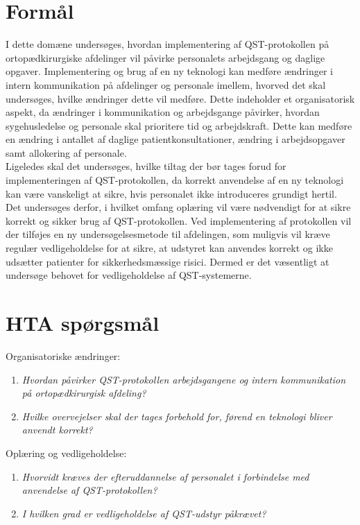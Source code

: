 \section{Formål}
I dette domæne undersøges, hvordan implementering af QST-protokollen på ortopædkirurgiske afdelinger vil påvirke personalets arbejdsgang og daglige opgaver. Implementering og brug af en ny teknologi kan medføre ændringer i intern kommunikation  på afdelinger og personale imellem, hvorved det skal undersøges, hvilke ændringer dette vil medføre. Dette indeholder et organisatorisk aspekt, da ændringer i kommunikation og arbejdsgange påvirker, hvordan sygehusledelse og personale skal prioritere tid og arbejdskraft. Dette kan medføre en ændring i antallet af daglige patientkonsultationer, ændring i arbejdsopgaver samt allokering af personale. \\
Ligeledes skal det undersøges, hvilke tiltag der bør tages forud for implementeringen af QST-protokollen, da korrekt anvendelse af en ny teknologi kan være vanskeligt at sikre, hvis personalet ikke introduceres grundigt hertil. Det undersøges derfor, i hvilket omfang oplæring vil være nødvendigt for at sikre korrekt og sikker brug af QST-protokollen. Ved implementering af protokollen vil der tilføjes en ny undersøgelsesmetode til afdelingen, som muligvis vil kræve regulær vedligeholdelse for at sikre, at udstyret kan anvendes korrekt og ikke udsætter patienter for sikkerhedsmæssige risici. Dermed er det væsentligt at undersøge behovet for vedligeholdelse af QST-systemerne.

\section{HTA spørgsmål}
Organisatoriske ændringer:
\begin{enumerate}
	\item \textit{Hvordan påvirker QST-protokollen arbejdsgangene og intern kommunikation på ortopædkirurgisk afdeling?} %
	\item \textit{Hvilke overvejelser skal der tages forbehold for, førend en teknologi bliver anvendt korrekt?} %
\end{enumerate}
Oplæring og vedligeholdelse:
\begin{enumerate}[resume]
	\item \textit{Hvorvidt kræves der efteruddannelse af personalet i forbindelse med anvendelse af QST-protokollen?} %
	\item \textit{I hvilken grad er vedligeholdelse af QST-udstyr påkrævet?} %
\end{enumerate}


